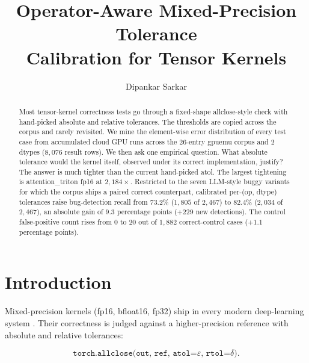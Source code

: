 \documentclass[runningheads]{llncs}
\begin{document}
\title{Operator-Aware Mixed-Precision Tolerance\\Calibration for Tensor Kernels}

\author{Dipankar Sarkar}

\maketitle

\begin{abstract}
Most tensor-kernel correctness tests go through a fixed-shape
allclose-style check with hand-picked absolute and relative
tolerances. The thresholds are copied across the corpus and rarely
revisited. We mine the element-wise error distribution of every test case from
accumulated cloud GPU runs across the 26-entry gpuemu corpus and 2
dtypes ($8{,}076$ result rows). We then ask one empirical
question. What absolute tolerance would the kernel itself, observed
under its correct implementation, justify? The answer is much
tighter than the current hand-picked atol. The largest tightening
is attention\_triton fp16 at $2{,}184\times$. Restricted to the
seven LLM-style buggy variants for which the corpus ships a paired
correct counterpart, calibrated per-(op, dtype) tolerances raise
bug-detection recall from 73.2\% ($1{,}805$ of $2{,}467$) to
82.4\% ($2{,}034$ of $2{,}467$), an absolute gain of $9.3$
percentage points (+229 new detections). The control false-positive
count rises from 0 to 20 out of $1{,}882$ correct-control cases
($+1.1$ percentage points).
\end{abstract}

\section{Introduction}
\label{sec:intro}

Mixed-precision kernels (fp16, bfloat16, fp32) ship in every modern
deep-learning system \cite{pytorchmixedprec,bfloat16study}. Their
correctness is judged against a higher-precision reference with
absolute and relative tolerances:

\[
\texttt{torch.allclose(out, ref, atol=$\varepsilon$, rtol=$\delta$)}.
\]
\end{document}
